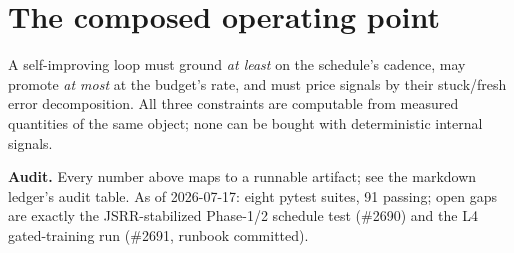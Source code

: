 \documentclass[11pt]{article}
\begin{document}
\section{The composed operating point}

A self-improving loop must ground \emph{at least} on the schedule's cadence, may promote
\emph{at most} at the budget's rate, and must price signals by their stuck/fresh error
decomposition. All three constraints are computable from measured quantities of the same
object; none can be bought with deterministic internal signals.

\begin{verifybox}
\textbf{Audit.} Every number above maps to a runnable artifact; see the markdown ledger's
audit table. As of 2026-07-17: eight pytest suites, 91 passing; open gaps are exactly the
JSRR-stabilized Phase-1/2 schedule test (\#2690) and the L4 gated-training run (\#2691,
runbook committed).
\end{verifybox}
\end{document}
